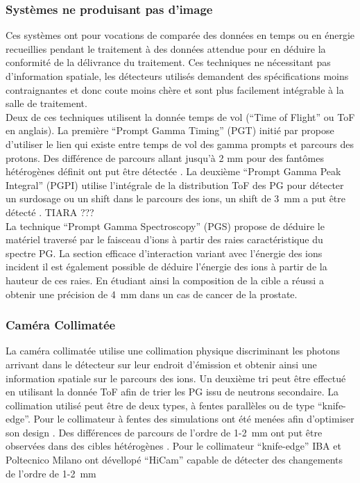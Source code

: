 \documentclass[11pt,a4paper,oldfontcommands]{memoir}
\begin{document}
\subsubsection{Systèmes ne produisant pas d'image}
Ces systèmes ont pour vocations de comparée des données en temps ou en énergie recueillies pendant le traitement à des données attendue pour en déduire la conformité de la délivrance du traitement. Ces techniques ne nécessitant pas d'information spatiale, les détecteurs utilisés demandent des spécifications moins contraignantes et donc coute moins chère et sont plus facilement intégrable à la salle de traitement.\\
Deux de ces techniques utilisent la donnée temps de vol (\enquote{Time of Flight} ou ToF en anglais). La première \enquote{Prompt Gamma Timing} (PGT) initié par \cite{Golnik_2014} propose d'utiliser le lien qui existe entre temps de vol des gamma prompts et parcours des protons. Des différence de parcours allant jusqu'à 2 mm pour des fantômes hétérogènes définit ont put être détectée \cite{Hueso_Gonz_lez_2015}. La deuxième \enquote{Prompt Gamma Peak Integral} (PGPI) utilise l'intégrale de la distribution ToF des PG pour détecter un surdosage ou un shift dans le parcours des ions, un shift de 3~mm a put être détecté \cite{KrimmerPGPI}. TIARA ???\\
La technique \enquote{Prompt Gamma Spectroscopy} (PGS) propose de déduire le matériel traversé par le faisceau d'ions à partir des raies caractéristique du spectre PG. La section efficace d'interaction variant avec l'énergie des ions incident il est également possible de déduire l'énergie des ions  à partir de la hauteur de ces raies. En étudiant ainsi la composition de la cible \cite{Testa_2014} a réussi a obtenir une précision de 4~mm dans un cas de cancer de la prostate.

\subsubsection{Caméra Collimatée}
La caméra collimatée utilise une collimation physique discriminant les photons arrivant dans le détecteur sur leur endroit d'émission et obtenir ainsi une information spatiale sur le parcours des ions. Un deuxième tri peut être effectué en utilisant la donnée ToF afin de trier les PG issu de neutrons secondaire. La collimation utilisé peut être de deux types, à fentes parallèles ou de type \enquote{knife-edge}. Pour le collimateur à fentes des simulations ont été menées afin d'optimiser son design \cite{Pinto_2014}\cite{MinSimu}. Des différences de parcours de l'ordre de 1-2~mm ont put être observées dans des cibles hétérogènes \cite{PintoCollimated}. Pour le collimateur \enquote{knife-edge} IBA et Poltecnico Milano ont dévellopé \enquote{HiCam} \cite{Smeets_2012} capable de détecter des changements de l'ordre de 1-2~mm
\end{document}
